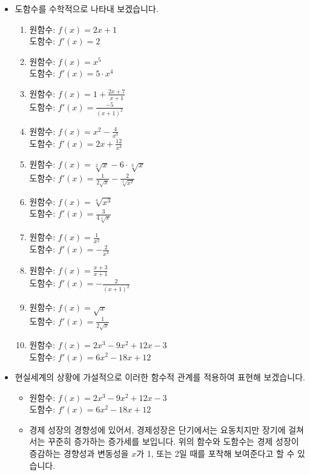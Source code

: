 \documentclass[
]{book}
\providecommand{\tightlist}{%
  \setlength{\itemsep}{0pt}\setlength{\parskip}{0pt}}
\begin{document}
\begin{itemize}
\item
  도함수를 수학적으로 나타내 보겠습니다.

  \begin{enumerate}
  \def\labelenumi{\arabic{enumi}.}
  \tightlist
  \item
    원함수: \(f(x) = 2x + 1\)\\
    도함수: \(f'(x) = 2\)
  \item
    원함수: \(f(x) = x^5\)\\
    도함수: \(f'(x) = 5\cdot x^4\)
  \item
    원함수: \(f(x) = 1 + \frac{2x+7}{x+1}\)\\
    도함수: \(f'(x) = \frac{-5}{(x+1)^2}\)
  \item
    원함수: \(f(x) = x^2 - \frac{4}{x^3}\)\\
    도함수: \(f'(x) = 2x + \frac{12}{x^4}\)
  \item
    원함수: \(f(x) = \sqrt[2]{x} -6\cdot \sqrt[3]{x}\)\\
    도함수: \(f'(x) = \frac{1}{2\sqrt{x}}-\frac{2}{\sqrt[3]{x^2}}\)
  \item
    원함수: \(f(x) = \sqrt[4]{x^3}\)\\
    도함수: \(f'(x) = \frac{3}{4\sqrt[4]{x}}\)
  \item
    원함수: \(f(x) = \frac{1}{x^2}\)\\
    도함수: \(f'(x) = -\frac{2}{x^3}\)
  \item
    원함수: \(f(x) = \frac{x+3}{x+1}\)\\
    도함수: \(f'(x) = -\frac{2}{(x+1)^2}\)
  \item
    원함수: \(f(x) = \sqrt{x}\)\\
    도함수: \(f'(x) = \frac{1}{2\sqrt{x}}\)
  \item
    원함수: \(f(x) = 2x^3-9x^2+12x-3\)\\
    도함수: \(f'(x) = 6x^2-18x+12\)
  \end{enumerate}
\item
  현실세계의 상황에 가설적으로 이러한 함수적 관계를 적용하여 표현해 보겠습니다.

  \begin{itemize}
  \item
    원함수: \(f(x) = 2x^3-9x^2+12x-3\)\\
    도함수: \(f'(x) = 6x^2-18x+12\)
  \item
    경제 성장의 경향성에 있어서, 경제성장은 단기에서는 요동치지만 장기에 걸쳐서는 꾸준히 증가하는 증가세를 보입니다. 위의 함수와 도함수는 경제 성장이 증감하는 경향성과 변동성을 \(x\)가 1, 또는 2일 때를 포착해 보여준다고 할 수 있습니다.
  \end{itemize}
\end{itemize}
\end{document}
